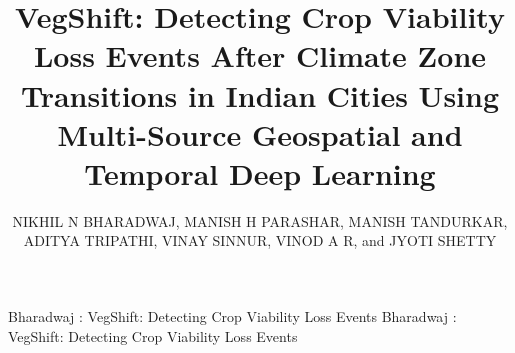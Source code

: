 \documentclass{ieeeaccess}
\begin{document}

\title{VegShift: Detecting Crop Viability Loss Events After Climate Zone Transitions in Indian Cities Using Multi-Source Geospatial and Temporal Deep Learning}

\author{\uppercase{Nikhil N Bharadwaj},
\uppercase{Manish H Parashar},
\uppercase{Manish Tandurkar},
\uppercase{Aditya Tripathi},
\uppercase{Vinay Sinnur},
\uppercase{Vinod A R},
and \uppercase{Jyoti Shetty}}
\address[1]{Department of Computer Science and Engineering, RV College of Engineering, Bengaluru, India (e-mail: nikhilnb.cs23@rvce.edu.in)}
\address[2]{Department of Computer Science and Engineering, RV College of Engineering, Bengaluru, India (e-mail: manishhparashar.cs23@rvce.edu.in)}
\address[3]{Department of Computer Science and Engineering, RV College of Engineering, Bengaluru, India (e-mail: manishtandurkar.cs23@rvce.edu.in)}
\address[4]{Department of Artificial Intelligence, RV College of Engineering, Bengaluru, India (e-mail: adityatripathi.ai23@rvce.edu.in)}
\address[5]{Department of Information Science and Engineering, RV College of Engineering, Bengaluru, India (e-mail: vinaysinnur.is23@rvce.edu.in)}
\address[6]{Department of Civil Engineering, RV College of Engineering, Bengaluru, India (e-mail: vinodar@rvce.edu.in)}
\address[7]{Department of Computer Science and Engineering, RV College of Engineering, Bengaluru, India (e-mail: jyothis@rvce.edu.in)}


\markboth
{Bharadwaj \headeretal: VegShift: Detecting Crop Viability Loss Events}
{Bharadwaj \headeretal: VegShift: Detecting Crop Viability Loss Events}
\end{document}
